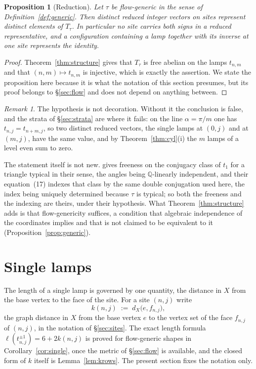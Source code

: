 \documentclass[11pt]{article}
\newtheorem{proposition}[theorem]{Proposition}
\theoremstyle{definition}
\theoremstyle{remark}
\newtheorem{remark}[theorem]{Remark}
\newcommand{\Q}{\mathbb{Q}}
\begin{document}
\begin{proposition}[Reduction]\label{prop:reduced}
Let $\tau$ be flow-generic in the sense of Definition~\ref{def:generic}. Then
distinct reduced integer vectors on sites represent distinct elements of
$T_\tau$. In particular no site carries both signs in a reduced representative,
and a configuration containing a lamp together with its inverse at one site
represents the identity.
\end{proposition}

\begin{proof}
Theorem~\ref{thm:structure} gives that $T_\tau$ is free abelian on the lamps
$t_{n,m}$ and that $(n,m)\mapsto t_{n,m}$ is injective, which is exactly the
assertion. We state the proposition here because it is what the notation of this
section presumes, but its proof belongs to \S\ref{sec:flow} and does not depend
on anything between.
\end{proof}

\begin{remark}\label{rem:reduced-hyp}
The hypothesis is not decoration. Without it the conclusion is false, and the
strata of \S\ref{sec:strata} are where it fails: on the line $\alpha=\pi/m$ one
has $t_{n,j}=t_{n+m,j}$, so two distinct reduced vectors, the single lamps at
$(0,j)$ and at $(m,j)$, have the same value, and by Theorem~\ref{thm:cyl}(i) the
$m$ lamps of a level even sum to zero.

The statement itself is not new. \cite[Thm.~4.1]{IP} gives freeness on the
conjugacy class of $t_1$ for a triangle typical in their sense, the angles being
$\Q$-linearly independent, and their equation~(17) indexes that class by the
same double conjugation used here, the index being uniquely determined because
$\tau$ is typical; so both the freeness and the indexing are theirs, under their
hypothesis. What Theorem~\ref{thm:structure} adds is that flow-genericity
suffices, a condition that algebraic independence of the coordinates implies and
that is not claimed to be equivalent to it (Proposition~\ref{prop:generic}).
\end{remark}

\section{Single lamps}\label{sec:shield}

The length of a single lamp is governed by one quantity, the distance in $X$
from the base vertex to the face of the site. For a site $(n,j)$ write
\[
   k(n,j)\;:=\;d_X\bigl(e,f_{n,j}\bigr),
\]
the graph distance in $X$ from the base vertex $e$ to the vertex set of the face
$f_{n,j}$ of $(n,j)$, in the notation of \S\ref{sec:sites}. The exact length
formula $\ell(t_{n,j}^{\pm1})=6+2k(n,j)$ is proved for flow-generic shapes in
Corollary~\ref{cor:single}, once the metric of \S\ref{sec:flow} is available,
and the closed form of $k$ itself is Lemma~\ref{lem:krows}. The present section
fixes the notation only.
\end{document}
